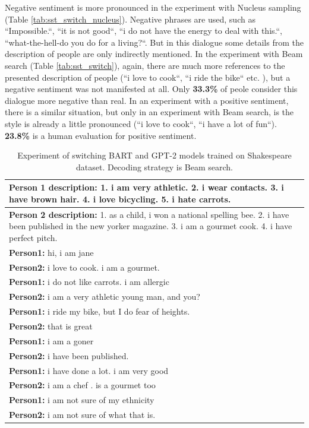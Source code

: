 Negative sentiment is more pronounced in the experiment with Nucleus sampling (Table \ref{tab:sst_switch_nucleus}). Negative phrases are used, such as ``Impossible.``, ``it is not good``, ``i do not have the energy to deal with this.``, ``what-the-hell-do you do for a living?``. But in this dialogue some details from the description of people are only indirectly mentioned. In the experiment with Beam search (Table \ref{tab:sst_switch}), again, there are much more references to the presented description of people (``i love to cook``, ``i ride the bike`` etc. ), but a negative sentiment was not manifested at all. Only \textbf{33.3\%} of peole consider this dialogue more negative than real. In an experiment with a positive sentiment, there is a similar situation, but only in an experiment with Beam search, is the style is already a little pronounced (``i love to cook``, ``i have a lot of fun``). \textbf{23.8\%} is a human evaluation for positive sentiment.

\begin{table}[H]
\centering
 \begin{tabular}{|p{14cm}|} 
 \hline
 \textbf{Person 1 description:} 1. i am very athletic. 2. i wear contacts. 3. i have brown hair. 4. i love bicycling. 5. i hate carrots. \\
 \hline
 \textbf{Person 2 description:} 1. as a child, i won a national spelling bee. 2. i have been published in the new yorker magazine. 3. i am a gourmet cook. 4. i have perfect pitch. \\
 \hline
 \textbf{Person1:} hi, i am jane  \\
 \textbf{Person2:} i love to cook. i am a gourmet. \\ 
 \textbf{Person1:} i do not like carrots. i am allergic \\
 \textbf{Person2:} i am a very athletic young man, and you?\\
 \textbf{Person1:} i ride my bike, but I do fear of heights. \\
 \textbf{Person2:} that is great \\
 \textbf{Person1:} i am a goner  \\
 \textbf{Person2:} i have been published.\\
 \textbf{Person1:} i have done a lot. i am very good  \\
 \textbf{Person2:} i am a chef . is a gourmet too \\
 \textbf{Person1:} i am not sure of my ethnicity \\
 \textbf{Person2:} i am not sure of what that is. \\
 \hline
 \end{tabular}
 \caption{Experiment of switching BART and GPT-2 models trained on Shakespeare dataset. Decoding strategy is Beam search.}
\label{tab:shakespeare_switch}
\end{table}

